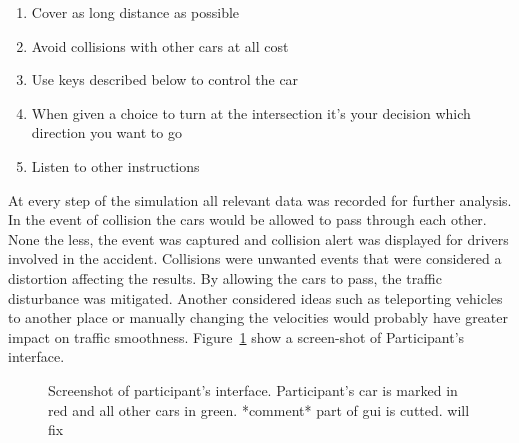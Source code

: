 \documentclass[11pt,english]{article}
\begin{document}
\begin{enumerate}
  \item Cover as long distance as possible
  \item Avoid collisions with other cars at all cost
  \item Use keys described below to control the car
  \item When given a choice to turn at the intersection it's your decision which direction you want to go
  \item Listen to other instructions
\end{enumerate}

At every step of the simulation all relevant data was recorded for further analysis. In the event of collision the cars would be allowed to pass through each other. None the less, the event was captured and collision alert was displayed for drivers involved in the accident. Collisions were unwanted events that were considered a distortion affecting the results. By allowing the cars to pass, the traffic disturbance was mitigated. Another considered ideas such as teleporting vehicles to another place or manually changing the velocities would probably have greater impact on traffic smoothness. Figure~\ref{fig:gui_4} show a screen-shot of Participant's interface.


\begin{figure}[] %
\caption{Screenshot of participant's interface. Participant's car is marked in red and all other cars in green. *comment* part of gui is cutted. will fix}
\label{fig:gui_4}
\end{figure}

\end{document}
